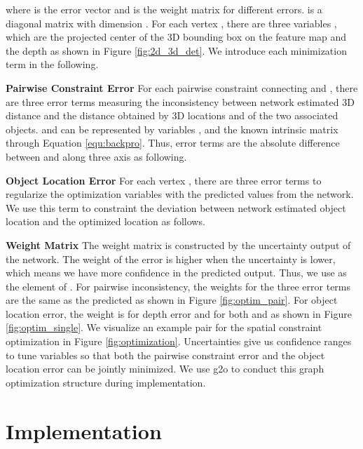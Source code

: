 \documentclass[10pt,twocolumn,letterpaper]{article}
\begin{document}
 where  is the error vector and  is the weight matrix for different errors.
  is a diagonal matrix with dimension . For each vertex , there are three variables , which are the projected center  of the 3D bounding box on the feature map and the depth  as shown in Figure \ref{fig:2d_3d_det}.
 We introduce each minimization term in the following.

 \vspace{2pt}\noindent\textbf{Pairwise Constraint Error}\hspace{5pt}
 For each pairwise constraint connecting  and , there are three error terms  measuring the inconsistency between network estimated 3D distance  and the distance  obtained by 3D locations  and  of the two associated objects.
   and  can be represented by variables ,
  and the known intrinsic matrix through Equation \ref{equ:backpro}.
 Thus, error terms  are the absolute difference between  and  along three axis as following.
 
 \vspace{2pt}\noindent\textbf{Object Location Error}
 For each vertex , there are three error terms  to regularize the optimization variables with the predicted values from the network.
 We use this term to constraint the deviation between network estimated object location and the optimized location as follows.
 

 \vspace{2pt}\noindent\textbf{Weight Matrix}\hspace{5pt}
 The weight matrix  is constructed by the uncertainty output  of the network. The weight of the error is higher when the uncertainty is lower, which means we have more confidence in the predicted output.
 Thus, we use  as the element of .
 For pairwise inconsistency, the weights for the three error terms   are the same as the predicted  as shown in Figure \ref{fig:optim_pair}.
 For object location error, the weight is  for depth error  and  for both  and  as shown in Figure \ref{fig:optim_single}.
 We visualize an example pair for the spatial constraint optimization in Figure \ref{fig:optimization}. Uncertainties give us confidence ranges to tune variables so that both the pairwise constraint error and
 the object location error can be jointly minimized.
 We use g2o \cite{kummerle2011g} to conduct this graph optimization structure during implementation.
  \section{Implementation}
\label{sec:implementation}
\end{document}
